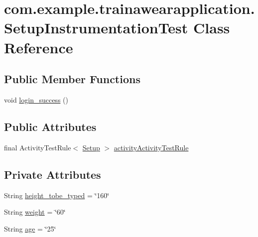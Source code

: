 \hypertarget{classcom_1_1example_1_1trainawearapplication_1_1_setup_instrumentation_test}{}\section{com.\+example.\+trainawearapplication.\+Setup\+Instrumentation\+Test Class Reference}
\label{classcom_1_1example_1_1trainawearapplication_1_1_setup_instrumentation_test}
\subsection*{Public Member Functions}
\begin{DoxyCompactItemize}
\item 
void \mbox{\hyperlink{classcom_1_1example_1_1trainawearapplication_1_1_setup_instrumentation_test_a4dbc2cfc0d101616f6c60f075bc55d58}{login\+\_\+success}} ()
\end{DoxyCompactItemize}
\subsection*{Public Attributes}
\begin{DoxyCompactItemize}
\item 
final Activity\+Test\+Rule$<$ \mbox{\hyperlink{classcom_1_1example_1_1trainawearapplication_1_1_setup}{Setup}} $>$ \mbox{\hyperlink{classcom_1_1example_1_1trainawearapplication_1_1_setup_instrumentation_test_ac9f8d1c61d6707efca17625aa2c3ca28}{activity\+Activity\+Test\+Rule}}
\end{DoxyCompactItemize}
\subsection*{Private Attributes}
\begin{DoxyCompactItemize}
\item 
String \mbox{\hyperlink{classcom_1_1example_1_1trainawearapplication_1_1_setup_instrumentation_test_a969cc5898cf6bdc58207c1944f573a78}{height\+\_\+tobe\+\_\+typed}} = \char`\"{}160\char`\"{}
\item 
String \mbox{\hyperlink{classcom_1_1example_1_1trainawearapplication_1_1_setup_instrumentation_test_a09706ee1f2c90e4a5ea3edb460714adb}{weight}} = \char`\"{}60\char`\"{}
\item 
String \mbox{\hyperlink{classcom_1_1example_1_1trainawearapplication_1_1_setup_instrumentation_test_a8c73f8c3f826243e4d875a7e5a9898ff}{age}} = \char`\"{}25\char`\"{}
\end{DoxyCompactItemize}


